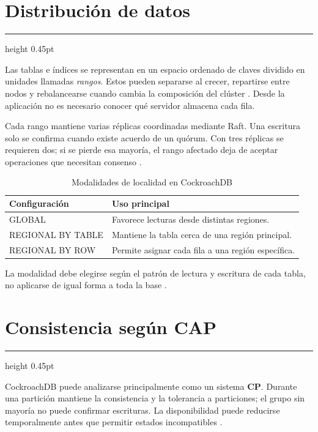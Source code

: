 \documentclass[11pt,a4paper]{article}
\newcommand{\sectionrule}{
    \vspace{-1pt}
    {\color{grisMedio}\hrule height 0.45pt}
    \vspace{2pt}
}
\begin{document}
\section{Distribución de datos}
\sectionrule

Las tablas e índices se representan en un espacio ordenado de claves dividido
en unidades llamadas \textit{rangos}. Estos pueden separarse al crecer,
repartirse entre nodos y rebalancearse cuando cambia la composición del
clúster \cite{distributionlayer,ajmani2022}. Desde la aplicación no es
necesario conocer qué servidor almacena cada fila.

Cada rango mantiene varias réplicas coordinadas mediante Raft. Una escritura
solo se confirma cuando existe acuerdo de un quórum. Con tres réplicas se
requieren dos; si se pierde esa mayoría, el rango afectado deja de aceptar
operaciones que necesitan consenso \cite{replicationlayer,hardrockcase}.

\begin{table}[ht]
\centering
\small
\caption{Modalidades de localidad en CockroachDB}
\begin{tabularx}{\textwidth}{@{}>{\ttfamily}l Y@{}}
\toprule
\textbf{Configuración} & \textbf{Uso principal} \\
\midrule
GLOBAL &
Favorece lecturas desde distintas regiones. \\

REGIONAL BY TABLE &
Mantiene la tabla cerca de una región principal. \\

REGIONAL BY ROW &
Permite asignar cada fila a una región específica. \\
\bottomrule
\end{tabularx}
\end{table}

La modalidad debe elegirse según el patrón de lectura y escritura de cada
tabla, no aplicarse de igual forma a toda la base
\cite{vanbenschoten2022,ajmani2022}.

\section{Consistencia según CAP}
\sectionrule

CockroachDB puede analizarse principalmente como un sistema \textbf{CP}.
Durante una partición mantiene la consistencia y la tolerancia a particiones;
el grupo sin mayoría no puede confirmar escrituras. La disponibilidad puede
reducirse temporalmente antes que permitir estados incompatibles
\cite{replicationlayer,transactionlayer}.
\end{document}
